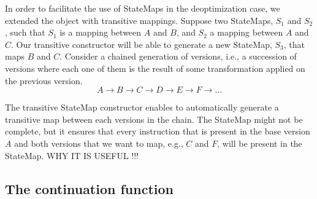In order to facilitate the use of StateMaps in the deoptimization case, we extended the object with transitive mappings.
Suppose two StateMaps, $S_1$ and $S_2$, such that $S_1$ is a mapping between $A$ and $B$, and $S_2$ a mapping between $A$ and $C$.
Our transitive constructor will be able to generate a new StateMap, $S_3$, that maps $B$ and $C$.
Consider a chained generation of versions, i.e., a succession of versions where each one of them is the result of some transformation applied on the previous version.
$$A \rightarrow B \rightarrow C \rightarrow D \rightarrow E \rightarrow F \rightarrow ...$$

The transitive StateMap constructor enables to automatically generate a transitive map between each versions in the chain.
The StateMap might not be complete, but it ensures that every instruction that is present in the base version $A$ and both versions that we want to map, e.g., $C$ and $F$, will be present in the StateMap.
WHY IT IS USEFUL !!!

\subsection{The continuation function}\label{thecontinuationfunction}




